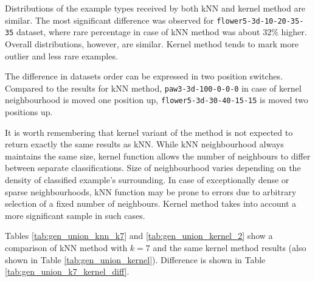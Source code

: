 \documentclass[12pt]{article}
\begin{document}
Distributions of the example types received by both kNN and kernel method are similar. The most significant difference was observed for \texttt{flower5-3d-10-20-35-35} dataset, where rare percentage in case of kNN method was about $32\%$ higher. Overall distributions, however, are similar. Kernel method tends to mark more outlier and less rare examples.

The difference in datasets order can be expressed in two position switches. Compared to the results for kNN method, \texttt{paw3-3d-100-0-0-0} in case of kernel neighbourhood is moved one position up, \texttt{flower5-3d-30-40-15-15} is moved two positions up.

It is worth remembering that kernel variant of the method is not expected to return exactly the same results as kNN. While kNN neighbourhood always maintains the same size, kernel function allows the number of neighbours to differ between separate classifications. Size of neighbourhood varies depending on the density of classified example's surrounding. In case of exceptionally dense or sparse neighbourhoods, kNN function may be prone to errors due to arbitrary selection of a fixed number of neighbours. Kernel method takes into account a more significant sample in such cases.

Tables \ref{tab:gen_union_knn_k7} and \ref{tab:gen_union_kernel_2} show a comparison of kNN method with $k=7$ and the same kernel method results (also shown in Table \ref{tab:gen_union_kernel}). Difference is shown in Table \ref{tab:gen_union_k7_kernel_diff}.
\end{document}
